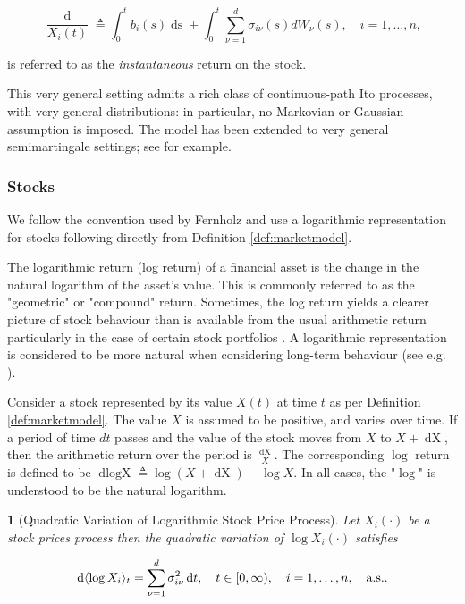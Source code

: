 \documentclass[british]{amsart} \usepackage{lmodern}
\numberwithin{equation}{section} \numberwithin{figure}{section}
\theoremstyle{plain} \newtheorem{thm}{\protect\theoremname}[section]
\theoremstyle{definition} \newtheorem{defn}[thm]{\protect\definitionname}
\theoremstyle{plain} \newtheorem{assumption}[thm]{\protect\assumptionname}
\theoremstyle{plain} \newtheorem{lem}[thm]{\protect\lemmaname}
\theoremstyle{plain} \newtheorem{prop}[thm]{\protect\propositionname}
\theoremstyle{remark} \newtheorem{rem}[thm]{\protect\remarkname}
\theoremstyle{plain} \newtheorem{cor}[thm]{\protect\corollaryname}
\renewcommand{\d}[1]{\mathop{\mathrm{d}{#1}}}
\newcommand{\defeq}{\mathop{\triangleq}} \newcommand{\almostsurely}{\text{a.s.}}
\newcommand{\rangei}{i=1,\dots,n} \newcommand{\measure}{\mathbb{P}}
\begin{document}
\begin{equation*}
  \frac{\d{X_{i}(t)}}{X_{i}(t)} \defeq 
  \int_{0}^{t} b_{i}(s)\d{s} + 
  \int_{0}^{t} \sum_{\nu=1}^{d} \sigma_{i\nu}(s) dW_{\nu}(s),
  \quad \rangei,
\end{equation*}

is referred to as the \textit{instantaneous} return on the stock.

This very general setting admits a rich class of continuous-path Ito processes,
with very general distributions: in particular, no Markovian or Gaussian
assumption is imposed. The model has been extended to very general
semimartingale settings; see \cite{kardaras2003} for example.

\subsubsection{Stocks}

We follow the convention used by Fernholz and use a logarithmic representation
for stocks following directly from Definition \ref{def:marketmodel}.

The logarithmic return (log return) of a financial asset is the change in the
natural logarithm of the asset's value. This is commonly referred to as the
"geometric" or "compound" return. Sometimes, the log return yields a clearer
picture of stock behaviour than is available from the usual arithmetic return
particularly in the case of certain stock portfolios
\cite{fernholz2007statistics}. A logarithmic representation is considered to be
more natural when considering long-term behaviour (see e.g.
\cite{fernholz1982}).

Consider a stock represented by its value $X(t)$ at time $t$ as per Definition
\ref{def:marketmodel}. The value $X$ is assumed to be positive, and varies over
time. If a period of time $dt$ passes and the value of the stock moves from $X$
to $X + \d{X}$, then the arithmetic return over the period is $\frac{\d{X}}{X}$.
The corresponding $\log$ return is defined to be $\d{\log{X}} \defeq \log{(X +
\d{X})} - \log{X}$. In all cases, the "$\log$" is understood to be the natural logarithm.

\begin{lem} [Quadratic Variation of Logarithmic Stock Price Process]

  Let $X_{i}(\cdot)$ be a stock prices process then the quadratic variation of
  $\log{X_{i}(\cdot)}$ satisfies

  \begin{equation} 
    \d{\langle \log{X_{i}} \rangle_{t}} = 
        \sum_{\nu=1}^{d} \sigma_{i\nu}^2\d{t}, 
    \quad \ranget, 
    \quad \rangei, 
    \quad \almostsurely.
  \end{equation} 

\end{lem}
\end{document}

